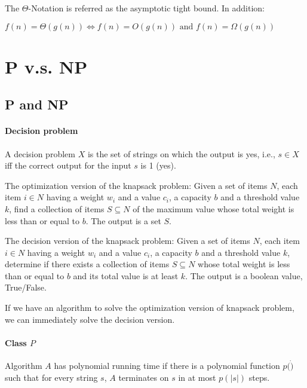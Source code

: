                 The $\Theta$-Notation is referred as the asymptotic tight bound. In addition:

                \begin{theorem}
                    $f(n) = \Theta(g(n)) \Leftrightarrow f(n) = O(g(n)) \text{ and } f(n) = \Omega(g(n))$
                \end{theorem}

    \section{P v.s. NP}
        \subsection{P and NP}
            \paragraph{Decision problem} A decision problem $X$ is the set of strings on which the output is yes, i.e., $s \in X$ iff the correct output for the input $s$ is 1 (yes).

                \begin{example}
                    The optimization version of the knapsack problem: Given a set of items $N$, each item $i \in N$ having a weight $w_i$ and a value $c_i$, a capacity $b$ and a threshold value $k$, find a collection of items $S \subseteq N$ of the maximum value whose total weight is less than or equal to $b$. The output is a set $S$.

                    The decision version of the knapsack problem: Given a set of items $N$, each item $i \in N$ having a weight $w_i$ and a value $c_i$, a capacity $b$ and a threshold value $k$, determine if there exists a collection of items $S \subseteq N$ whose total weight is less than or equal to $b$ and its total value is at least $k$. The output is a boolean value, True/False.
                \end{example}

                If we have an algorithm to solve the optimization version of knapsack problem, we can immediately solve the decision version. 

            \paragraph{Class $P$}
                \begin{definition}
                    Algorithm $A$ has polynomial running time if there is a polynomial function $p(\dot)$ such that for every string $s$, $A$ terminates on $s$ in at most $p(|s|)$ steps.
                \end{definition}

